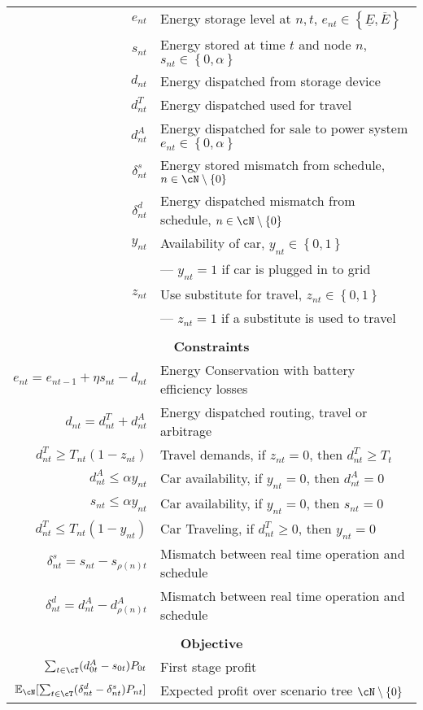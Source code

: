 {\begin{longtable}{ r l }
$ e_{nt} $		&	Energy storage level at $n,t$, $e_{nt} \in \left\{ \underline{E} , \overline{E} \right\}$	\\
$ s_{nt} $		&	Energy stored at time $t$ and node $n$,  $s_{nt} \in \left\{ 0  , \alpha \right\}$ \\
$ d_{nt} $		&	Energy dispatched from storage device \\
$ d^T_{nt} $		&	Energy dispatched used for travel 	\\
$ d^A_{nt} $		&	Energy dispatched for sale to power system   $e_{nt} \in \left\{ 0 , \alpha \right\}$ \\
$ \delta^s_{nt} $	&	Energy stored mismatch from schedule, $n \in \cN \setminus \left\{ 0 \right\}$	\\
$ \delta^d_{nt} $	&	Energy dispatched mismatch from schedule, $n \in \cN \setminus \left\{ 0 \right\}$	\\
$ y_{nt}$		&	Availability of car, $y_{nt} \in \left\{ 0, 1 \right\} $\\
			&	--- $y_{nt} = 1$ if car is plugged in to grid 	\\
$ z_{nt} $		&	Use substitute for travel, $z_{nt}\in \left\{ 0, 1 \right\} $\\
			&	--- $z_{nt} = 1$ if a substitute is used to travel 	\\
	&	\\

\multicolumn{2}{c}{\bf Constraints}		\\
\hline
$e_{nt} = e_{n t-1} + \eta s_{nt} - d_{nt} $	&	Energy Conservation with battery efficiency losses	\\
$d_{nt} = d^T_{nt} + d^A_{nt}	$		&	Energy dispatched routing, travel or arbitrage \\
$d^T_{nt} \ge T_{nt} ( 1 - z_{nt} ) 		$		&	Travel demands, if $z_{nt} = 0$, then $d^T_{nt} \ge T_t$	\\
$d^A_{nt} \le \alpha y_{nt}	$		&	Car availability, if $y_{nt} = 0$, then $d^A_{nt} = 0$		\\
$s_{nt} \le \alpha y_{nt}	$		&	Car availability, if $y_{nt} = 0$, then $s_{nt} = 0$		\\
$d^T_{nt}	\le	T_{nt} (1 - y_{nt} ) $		&	Car Traveling, if $d^T_{nt} \ge 0$, then $y_{nt} = 0$		\\
$\delta^s_{nt} = s_{nt} - s_{\rho(n) t} $		&	Mismatch between real time operation and schedule 	\\
$\delta^d_{nt} = d^A_{nt} - d^A_{\rho(n) t} $		&	Mismatch between real time operation and schedule 	\\


	&	\\

\multicolumn{2}{c}{\bf Objective}		\\
\hline
$ \sum_{t \in \cT} ( d^A_{0t} - s_{0t} ) P_{0t} $	&	First stage profit	\\
$ \mathbb{E}_\cN [  \sum_{t \in \cT}( \delta^d_{nt} - \delta^s_{nt} ) P_{nt}	]$&	Expected profit over scenario tree $\cN \setminus \left\{ 0 \right\}$

\end{longtable}
}
